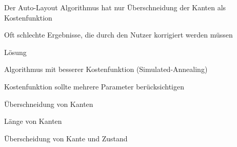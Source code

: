 {
    \begin{itemgroup}{}
	\item Der Auto-Layout Algorithmus hat nur Überschneidung der Kanten als
	Kostenfunktion
	\item Oft schlechte Ergebnisse, die durch den Nutzer korrigiert werden müssen
    \end{itemgroup}

    \begin{itemgroup}{Lösung}
	\item Algorithmus mit besserer Kostenfunktion (Simulated-Annealing)
	\item Kostenfunktion sollte mehrere Parameter berücksichtigen
		\begin{itemgroup}{}
		\item Überschneidung von Kanten
		\item Länge von Kanten
		\item Überscheidung von Kante und Zustand
		\end{itemgroup}
	\end{itemgroup}
    
    \vfill{}
}


